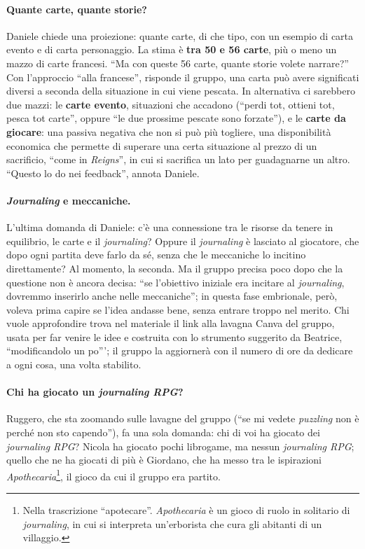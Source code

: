 \paragraph{Quante carte, quante storie?} Daniele chiede una proiezione: quante carte, di
che tipo, con un esempio di carta evento e di carta personaggio. La stima è
\textbf{tra 50 e 56 carte}, più o meno un mazzo di carte francesi. ``Ma con queste 56
carte, quante storie volete narrare?'' Con l'approccio ``alla francese'', risponde il
gruppo, una carta può avere significati diversi a seconda della situazione in cui viene
pescata. In alternativa ci sarebbero due mazzi: le \textbf{carte evento}, situazioni che
accadono (``perdi tot, ottieni tot, pesca tot carte'', oppure ``le due prossime pescate
sono forzate''), e le \textbf{carte da giocare}: una passiva negativa che non si può più
togliere, una disponibilità economica che permette di superare una certa situazione al
prezzo di un sacrificio, ``come in \emph{Reigns}'', in cui si sacrifica un lato per
guadagnarne un altro. ``Questo lo do nei feedback'', annota Daniele.

\paragraph{\emph{Journaling} e meccaniche.} L'ultima domanda di Daniele: c'è una
connessione tra le risorse da tenere in equilibrio, le carte e il \emph{journaling}?
Oppure il \emph{journaling} è lasciato al giocatore, che dopo ogni partita deve farlo da
sé, senza che le meccaniche lo incitino direttamente? Al momento, la seconda. Ma il
gruppo precisa poco dopo che la questione non è ancora decisa: ``se l'obiettivo iniziale
era incitare al \emph{journaling}, dovremmo inserirlo anche nelle meccaniche''; in questa
fase embrionale, però, voleva prima capire se l'idea andasse bene, senza entrare troppo
nel merito. Chi vuole approfondire trova nel materiale il link alla lavagna Canva del
gruppo, usata per far venire le idee e costruita con lo strumento suggerito da Beatrice,
``modificandolo un po'''; il gruppo la aggiornerà con il numero di ore da dedicare a
ogni cosa, una volta stabilito.

\paragraph{Chi ha giocato un \emph{journaling RPG}?} Ruggero, che sta zoomando sulle
lavagne del gruppo (``se mi vedete \emph{puzzling} non è perché non sto capendo''), fa
una sola domanda: chi di voi ha giocato dei \emph{journaling RPG}? Nicola ha giocato
pochi librogame, ma nessun \emph{journaling RPG}; quello che ne ha giocati di più è
Giordano, che ha messo tra le ispirazioni \emph{Apothecaria}\footnote{Nella
trascrizione ``apotecare''. \emph{Apothecaria} è un gioco di ruolo in solitario di
\emph{journaling}, in cui si interpreta un'erborista che cura gli abitanti di un
villaggio.}, il gioco da cui il gruppo era partito.

